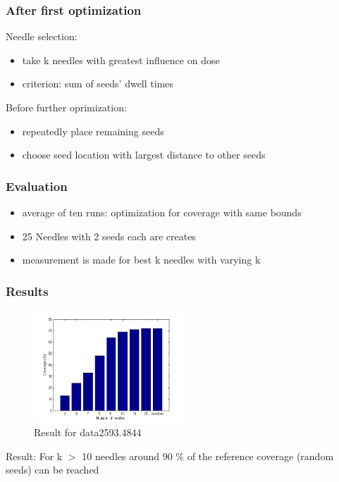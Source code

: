 \documentclass{beamer}
\begin{document}
	\begin{frame}
	\frametitle{After first optimization}
		Needle selection:
		\begin{itemize}
		\item take k needles with greatest influence on dose
		\item criterion: sum of seeds' dwell times
		\end{itemize}
		Before further oprimization:
		\begin{itemize}
		\item repeatedly place remaining seeds
		\item choose seed location with largest distance to other seeds
		\end{itemize}
	\end{frame}
	\begin{frame}
	\frametitle{Evaluation}
		\begin{itemize}
		\item average of ten runs: optimization for coverage with same bounds
		\item 25 Needles with 2 seeds each are creates
		\item measurement is made for best k needles with varying k
		\end{itemize}
	\end{frame}
	\begin{frame}
	\frametitle{Results}
		\begin{figure}[h]
		\centering
		\includegraphics[width=0.5\textwidth]{pictures/histogramm_nadeln}
		\caption{Result for data2593.4844}
		\end{figure}
		Result: For k $>$ 10 needles around 90 \% of the reference coverage (random seeds) can be reached 
		
	\end{frame}


	 
\end{document}
